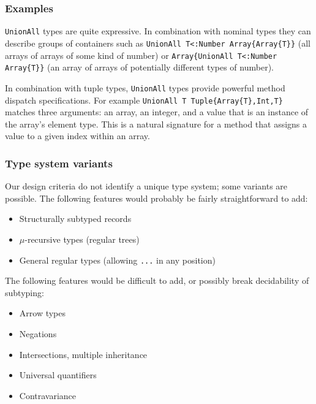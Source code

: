 
\subsubsection{Examples}

\texttt{UnionAll} types are quite expressive. In combination with nominal
types they can describe groups of containers such as
\texttt{UnionAll T<:Number Array\{Array\{T\}\}} (all arrays of arrays of
some kind of number) or
\texttt{Array\{UnionAll T<:Number Array\{T\}\}} (an array of arrays of
potentially different types of number).

In combination with tuple types, \texttt{UnionAll} types provide powerful
method dispatch specifications. For example
\texttt{UnionAll T Tuple\{Array\{T\},Int,T\}} matches three arguments:
an array, an integer, and a value that is an instance of the array's
element type. This is a natural signature for a method that assigns a
value to a given index within an array.

\subsubsection{Type system variants}

Our design criteria do not identify a unique type system; some
variants are possible.
The following features would probably be fairly straightforward to add:

\vspace{-3ex}
\begin{singlespace}
\begin{itemize}
\item Structurally subtyped records
\item $\mu$-recursive types (regular trees)
\item General regular types (allowing \texttt{...} in any position)
\end{itemize}
\end{singlespace}

\noindent
The following features would be difficult to add, or possibly break decidability
of subtyping:

\vspace{-3ex}
\begin{singlespace}
\begin{itemize}
\item Arrow types
\item Negations
\item Intersections, multiple inheritance
\item Universal quantifiers
\item Contravariance
\end{itemize}
\end{singlespace}


